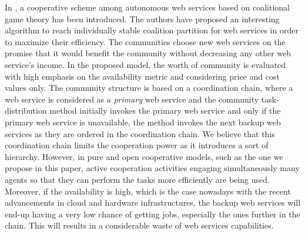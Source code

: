 \documentclass[10pt,journal,cspaper,compsoc]{IEEEtran}
\begin{document}
In \cite{10.1109/TSC.2012.12}, a cooperative scheme among
autonomous web services based on coalitional game theory has been
introduced. The authors have proposed an interesting algorithm to
reach individually stable coalition partition for web services in
order to maximize their efficiency. The communities choose new web
services on the promise that it would benefit the community
without decreasing any other web service's income. In the proposed
model, the worth of community is evaluated with high emphasis on
the availability metric and considering price and cost values
only. The community structure is based on a coordination chain,
where a web service is considered as a \emph{primary} web service
and the community task-distribution method initially invokes the
primary web service and only if the primary web service is
unavailable, the method invokes the next backup web services as
they are ordered in the coordination chain. We believe that this
coordination chain limits the cooperation power as it introduces a
sort of hierarchy. However, in pure and open cooperative models,
such as the one we propose in this paper, active cooperation
activities engaging simultaneously many agents so that they can
perform the tasks more efficiently are being used. Moreover, if
the availability is high, which is the case nowadays with the
recent advancements in cloud and hardware infrastructures, the
backup web services will end-up having a very low chance of
getting jobs, especially the ones further in the chain. This will
results in a considerable waste of web services capabilities.
\end{document}
